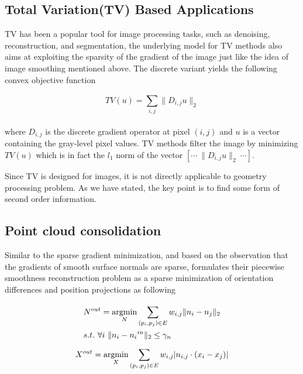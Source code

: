 \subsection{Total Variation(TV) Based Applications}
\label{subsec:TV Applications}

TV has been a popular tool for image processing tasks, such as denoising, reconstruction, and segmentation\cite{chambolle2010introduction}, the underlying model for TV methods also aims at exploiting the sparsity of the gradient of the image just like the idea of image smoothing\cite{xu2011image} mentioned above. The discrete variant yields the following convex objective function

\small{
\begin{equation}
 \label{eq:descreteTV}
 TV(u)=\sum_{i,j}^{}\|D_{i,j}u\|_2
\end{equation}
}
\\
where $D_{i,j}$ is the discrete gradient operator at pixel $(i,j)$ and $u$ is a vector containing the gray-level pixel values. TV methods filter the image by minimizing $TV(u)$ which is in fact the $l_1$ norm of the vector $[\cdots~\|D_{i,j}u\|_2~\cdots]$.

Since TV is designed for images, it is not directly applicable to geometry processing problem.
As we have stated, the key point is to find some form of second order information.


\subsection{Point cloud consolidation}
\label{subsec:TVPoint cloud consolidation}

Similar to the sparse gradient minimization, and based on the observation that the gradients of smooth surface normals are sparse,
\cite{avron2010L1} formulates their piecewise smoothness reconstruction problem as a sparse minimization of orientation differences and position projections as following

\small{
\begin{equation}
 \label{eq:TVconsolidation1}
 \begin{aligned}
 &N^{out} =\mathop{\operatorname*{argmin}}_{N} \sum_{(p_{i},p_{j})\in E}^{} w_{i,j}\|n_{i}-n_{j}\|_2\\
 &s.t.~\forall i~\|n_{i}-{n_{i}}^{in}\|_2\le \gamma_{n}
 \end{aligned}
\end{equation}
}
\small{
\begin{equation}
 \label{eq:TVconsolidation2}
 X^{out} = \mathop{\operatorname*{argmin}}_{X} \sum_{(p_{i},p_{j})\in E}^{} w_{i,j}|n_{i,j}\cdot (x_{i}-x_{j})|
\end{equation}
}

